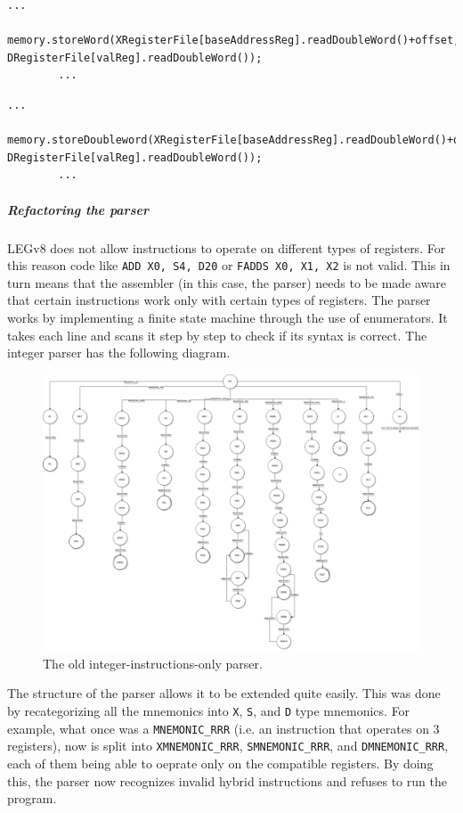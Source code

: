 	\begin{lstlisting}[caption={STURS}]
		...
		memory.storeWord(XRegisterFile[baseAddressReg].readDoubleWord()+offset, DRegisterFile[valReg].readDoubleWord());
		...
	\end{lstlisting}
	\begin{lstlisting}[caption={STURD}]
		...
		memory.storeDoubleword(XRegisterFile[baseAddressReg].readDoubleWord()+offset, DRegisterFile[valReg].readDoubleWord());
		...
	\end{lstlisting}

\subparagraph*{Refactoring the parser}

LEGv8 does not allow instructions to operate on different types of registers. For this reason code like \verb|ADD X0, S4, D20| or \verb|FADDS X0, X1, X2| is not valid. This in turn means that the assembler (in this case, the parser) needs to be made aware that certain instructions work only with certain types of registers. 
\newline
The parser works by implementing a finite state machine through the use of enumerators. It takes each line and scans it step by step to check if its syntax is correct. The integer parser has the following diagram.

\begin{figure}[H]
	\centering
	\includegraphics[width=\textwidth]{img/parser_diagram.png}
	\caption{The old integer-instructions-only parser.}
\end{figure}

The structure of the parser allows it to be extended quite easily. This was done by recategorizing all the mnemonics into \verb|X|, \verb|S|, and \verb|D| type mnemonics. For example, what once was a \verb|MNEMONIC_RRR| (i.e. an instruction that operates on 3 registers), now is split into \verb|XMNEMONIC_RRR|,  \verb|SMNEMONIC_RRR|, and  \verb|DMNEMONIC_RRR|, each of them being able to oeprate only on the compatible registers. By doing this, the parser now recognizes invalid hybrid instructions and refuses to run the program.

